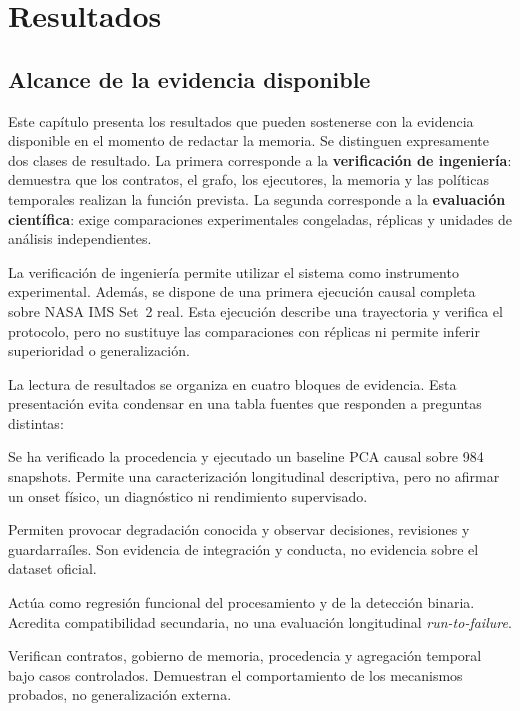 \chapter{Resultados}

\section{Alcance de la evidencia disponible}

Este capítulo presenta los resultados que pueden sostenerse con la evidencia
disponible en el momento de redactar la memoria. Se distinguen expresamente dos
clases de resultado. La primera corresponde a la \textbf{verificación de
ingeniería}: demuestra que los contratos, el grafo, los ejecutores, la memoria
y las políticas temporales realizan la función prevista. La segunda corresponde
a la \textbf{evaluación científica}: exige comparaciones experimentales
congeladas, réplicas y unidades de análisis independientes.

La verificación de ingeniería permite utilizar el sistema como instrumento
experimental. Además, se dispone de una primera ejecución causal completa sobre
NASA IMS Set~2 real. Esta ejecución describe una trayectoria y verifica el
protocolo, pero no sustituye las comparaciones con réplicas ni permite inferir
superioridad o generalización.

La lectura de resultados se organiza en cuatro bloques de evidencia. Esta
presentación evita condensar en una tabla fuentes que responden a preguntas
distintas:

\begin{description}[style=nextline]
  \item[Trayectoria oficial NASA IMS Set~2.] Se ha verificado la procedencia y
        ejecutado un baseline PCA causal sobre 984 snapshots. Permite una
        caracterización longitudinal descriptiva, pero no afirmar un onset
        físico, un diagnóstico ni rendimiento supervisado.
  \item[Pilotos NASA IMS-like sintéticos.] Permiten provocar degradación
        conocida y observar decisiones, revisiones y guardarraíles. Son
        evidencia de integración y conducta, no evidencia sobre el dataset
        oficial.
  \item[CWRU.] Actúa como regresión funcional del procesamiento y de la
        detección binaria. Acredita compatibilidad secundaria, no una
        evaluación longitudinal \textit{run-to-failure}.
  \item[Pruebas deterministas.] Verifican contratos, gobierno de memoria,
        procedencia y agregación temporal bajo casos controlados. Demuestran el
        comportamiento de los mecanismos probados, no generalización externa.
\end{description}

